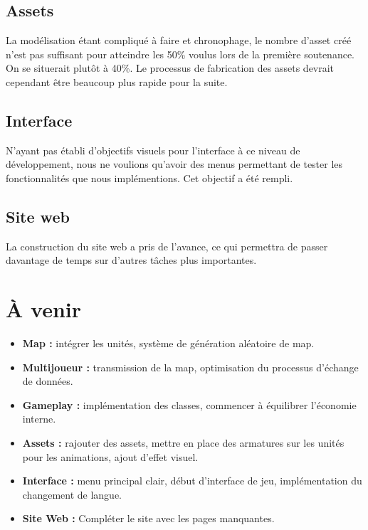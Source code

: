 \documentclass[12pt]{report}
\begin{document}
\section*{Assets}

La modélisation étant compliqué à faire et chronophage, le nombre d’asset créé n’est pas suffisant pour atteindre les 50\% voulus lors de la première soutenance. On se situerait plutôt à 40\%. Le processus de fabrication des assets devrait cependant être beaucoup plus rapide pour la suite.

\section*{Interface}

N’ayant pas établi d’objectifs visuels pour l’interface à ce niveau de développement, nous ne voulions qu’avoir des menus permettant de tester les fonctionnalités que nous implémentions. Cet objectif a été rempli.

\section*{Site web}

La construction du site web a pris de l'avance, ce qui permettra de passer davantage de temps sur d'autres tâches plus importantes.

\chapter{À venir}

\begin{itemize}
	\item \textbf{Map :} intégrer les unités, système de génération aléatoire de map.
	\item \textbf{Multijoueur :} transmission de la map, optimisation du processus d'échange de données.
	\item \textbf{Gameplay :} implémentation des classes, commencer à équilibrer l’économie interne.
	\item \textbf{Assets :} rajouter des assets, mettre en place des armatures sur les unités pour les animations, ajout d'effet visuel.
	\item \textbf{Interface :} menu principal clair, début d'interface de jeu, implémentation du changement de langue.
	\item \textbf{Site Web :} Compléter le site avec les pages manquantes.
\end{itemize}
\end{document}
